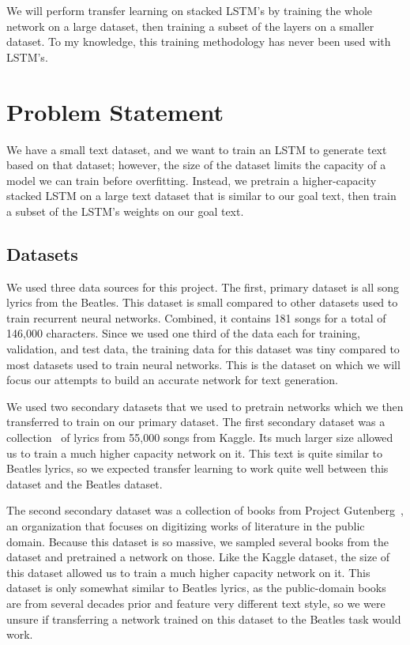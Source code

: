 \documentclass[10pt,twocolumn,letterpaper]{article}
\begin{document}
		We will perform transfer learning on stacked LSTM's by training the whole network on a large dataset, then training a subset of the layers on a smaller dataset. To my knowledge, this training methodology has never been used with LSTM's.
\section{Problem Statement}
	We have a small text dataset, and we want to train an LSTM to generate text based on that dataset; however, the size of the dataset limits the capacity of a model we can train before overfitting. Instead, we pretrain a higher-capacity stacked LSTM on a large text dataset that is similar to our goal text, then train a subset of the LSTM's weights on our goal text.
	\subsection{Datasets}
		We used three data sources for this project. The first, primary dataset is all song lyrics from the Beatles. This dataset is small compared to other datasets used to train recurrent neural networks. Combined, it contains 181 songs for a total of 146,000 characters. Since we used one third of the data each for training, validation, and test data, the training data for this dataset was tiny compared to most datasets used to train neural networks. This is the dataset on which we will focus our attempts to build an accurate network for text generation.
		
		We used two secondary datasets that we used to pretrain networks which we then transferred to train on our primary dataset. The first secondary dataset was a collection~\cite{KaggleLyrics} of lyrics from 55,000 songs from Kaggle. Its much larger size allowed us to train a much higher capacity network on it. This text is quite similar to Beatles lyrics, so we expected transfer learning to work quite well between this dataset and the Beatles dataset.
		
		The second secondary dataset was a collection of books from Project Gutenberg~\cite{Gutenberg}, an organization that focuses on digitizing works of literature in the public domain. Because this dataset is so massive, we sampled several books from the dataset and pretrained a network on those. Like the Kaggle dataset, the size of this dataset allowed us to train a much higher capacity network on it. This dataset is only somewhat similar to Beatles lyrics, as the public-domain books are from several decades prior and feature very different text style, so we were unsure if transferring a network trained on this dataset to the Beatles task would work.
		
\end{document}
